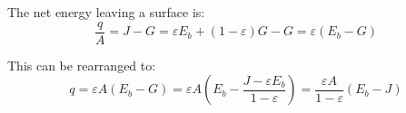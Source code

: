 The net energy leaving a surface is:
\[
\frac{q}{A} = J - G = \varepsilon E_b + (1-\varepsilon)G - G = \varepsilon (E_b - G)
\]

This can be rearranged to:
\[
q = \varepsilon A (E_b - G) = \varepsilon A \left(E_b - \frac{J-\varepsilon E_b}{1-\varepsilon}\right) = \frac{\varepsilon A}{1-\varepsilon}(E_b - J)
\]







